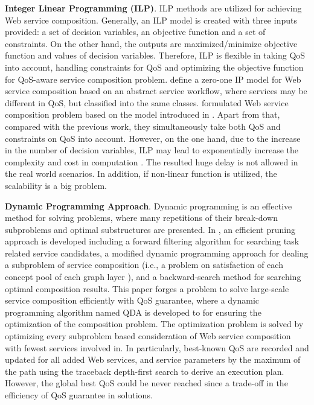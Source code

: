\textbf{Integer Linear Programming (ILP)}. ILP methods are utilized for achieving Web service composition. Generally, an ILP model is created with three inputs provided: a set of decision variables, an objective function and a set of constraints. On the other hand, the outputs are maximized/minimize objective function and values of decision variables. Therefore, ILP is flexible in taking QoS into account, handling constraints for QoS and optimizing the objective function for QoS-aware service composition problem. \cite{gao2005Web} define a zero-one IP model for Web service composition based on an abstract service workflow, where services may be different in QoS, but classified into the same classes.  \cite{yoo2008Web} formulated Web service composition problem based on the model introduced in \cite{gao2005Web}. Apart from that, compared with the previous work, they simultaneously take both QoS and constraints on QoS into account. However, on the one hand, due to the increase in the number of decision variables, ILP may lead to exponentially increase the complexity and cost in computation \cite{li2016full}. The resulted huge delay is not allowed in the real world scenarios. In addition, if non-linear function is utilized, the scalability is a big problem.
 
\textbf{Dynamic Programming Approach}. Dynamic programming is an effective method for solving problems, where many repetitions of their break-down subproblems and optimal substructures are presented. In  \cite{huang2009effective}, an efficient pruning approach is developed including a forward filtering algorithm for searching task related service candidates, a modified dynamic programming approach for dealing a subproblem of service composition (i.e., a  problem on satisfaction of each concept pool of each graph layer ), and a backward-search method for searching optimal composition results. This paper \cite{xu2012towards} forges a problem to solve large-scale service composition efficiently with QoS guarantee, where a dynamic programming algorithm named QDA is developed to for ensuring the optimization of the composition problem. The optimization problem is solved by optimizing every subproblem based consideration of Web service composition with fewest services involved in.  In particularly, best-known QoS are recorded and updated for all added Web services, and service parameters by the maximum of the path using the traceback depth-first search to derive an execution plan. However, the global best QoS could be never reached since a trade-off in the efficiency of QoS guarantee in solutions.

